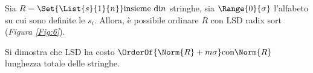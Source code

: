 \documentclass{subfiles}
\begin{document}
Sia \(R = \Set{\List{s}{1}{n}} \text{insieme di} n\) stringhe, sia \(\Range{0}{\sigma}\) l'alfabeto su cui sono definite le \(s_{i}\).
Allora, è possibile ordinare \(R\) con LSD radix sort (\emph{Figura \ref{Fig:6}}).


\noindent Si dimostra che LSD ha costo \(\OrderOf{\Norm{R} + m\sigma} \text{con} \Norm{R}\) lunghezza totale delle stringhe.
\end{document}
